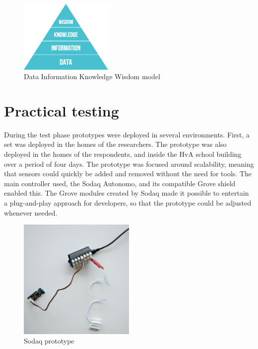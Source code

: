 \documentclass{below-ext}
\begin{document}
\begin{figure}
\centering
\includegraphics[width=0.4\textwidth]{dikw}
\caption{Data Information Knowledge Wisdom model}
\label{fig:dikw}
\end{figure}

\section{Practical testing}
During the test phase prototypes were deployed in several environments. First, a set was deployed in the homes of the researchers. The prototype was also deployed in the homes of the respondents, and inside the HvA school building over a period of four days. The prototype was focused around scalability, meaning that sensors could quickly be added and removed without the need for tools. The main controller used, the Sodaq Autonomo, and its compatible Grove shield enabled this. The Grove modules created by Sodaq made it possible to entertain a plug-and-play approach for developers, so that the prototype could be adjusted whenever needed. 

\begin{figure}
\includegraphics[width=0.5\textwidth]{sodaq}
\caption{Sodaq prototype}
\label{fig:sodaq}
\end{figure}
\end{document}
